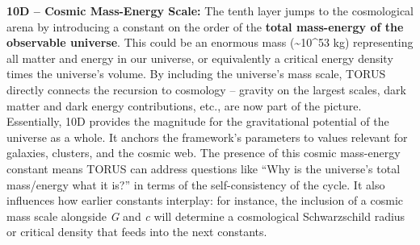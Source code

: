 \documentclass[]{article}
\begin{document}
\textbf{10D -- Cosmic Mass-Energy Scale:} The tenth layer jumps to the
cosmological arena by introducing a constant on the order of the
\textbf{total mass-energy of the observable universe}. This could be an
enormous mass (\textasciitilde{}10\^{}53 kg) representing all matter and
energy in our universe, or equivalently a critical energy density times
the universe's volume. By including the universe's mass scale, TORUS
directly connects the recursion to cosmology -- gravity on the largest
scales, dark matter and dark energy contributions, etc., are now part of
the picture. Essentially, 10D provides the magnitude for the
gravitational potential of the universe as a whole. It anchors the
framework's parameters to values relevant for galaxies, clusters, and
the cosmic web. The presence of this cosmic mass-energy constant means
TORUS can address questions like ``Why is the universe's total
mass/energy what it is?'' in terms of the self-consistency of the cycle.
It also influences how earlier constants interplay: for instance, the
inclusion of a cosmic mass scale alongside \emph{G} and \emph{c} will
determine a cosmological Schwarzschild radius or critical density that
feeds into the next constants.
\end{document}
